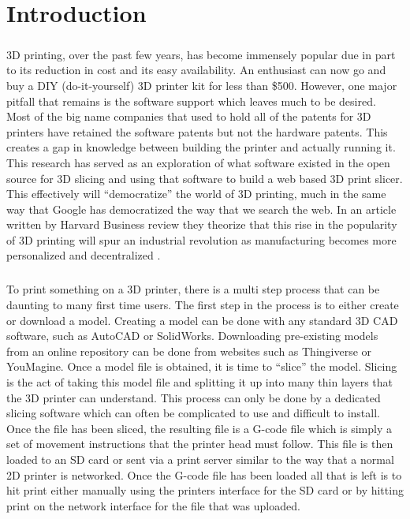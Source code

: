 \chapter{Introduction}
\paragraph{}
3D printing, over the past few years, has become immensely popular due in part to its reduction in cost and its easy availability.
An enthusiast can now go and buy a DIY (do-it-yourself) 3D printer kit for less than \$500.
However, one major pitfall that remains is the software support which leaves much to be desired.
Most of the big name companies that used to hold all of the patents for 3D printers have retained the software patents but not the hardware patents. 
This creates a gap in knowledge between building the printer and actually running it.
This research has served as an exploration of what software existed in the open source for 3D slicing and using that software to build a web based 3D print slicer.
This effectively will “democratize” the world of 3D printing, much in the same way that Google has democratized the way that we search the web. 
In an article written by Harvard Business review they theorize that this rise in the popularity of 3D printing will spur an industrial revolution as manufacturing becomes more personalized and decentralized \citep{daveni-2015}.

\paragraph{}
To print something on a 3D printer, there is a multi step process that can be daunting to many first time users. 
The first step in the process is to either create or download a model.
Creating a model can be done with any standard 3D CAD software, such as AutoCAD or SolidWorks.
Downloading pre-existing models from an online repository can be done from websites such as Thingiverse or YouMagine.
Once a model file is obtained, it is time to “slice” the model.
Slicing is the act of taking this model file and splitting it up into many thin layers that the 3D printer can understand.
This process can only be done by a dedicated slicing software which can often be complicated to use and difficult to install.
Once the file has been sliced, the resulting file is a G-code file which is simply a set of movement instructions that the printer head must follow.
This file is then loaded to an SD card or sent via a print server similar to the way that a normal 2D printer is networked.
Once the G-code file has been loaded all that is left is to hit print either manually using the printers interface for the SD card or by hitting print on the network interface for the file that was uploaded.

